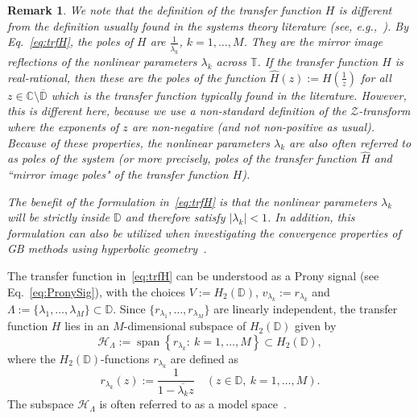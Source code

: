 \documentclass{arxiv}
\renewcommand{\hat}{\widehat}
\newtheorem{remarks}{Remark}[section]
\begin{document}
\begin{remarks}
\label{rem:mirrorpole}
We note that the definition of the transfer function $H$ is different from the definition usually found in the systems theory literature (see, e.g.,~\cite{vandenhof}). By Eq.~\eqref{eq:trfH}, the poles of $H$ are $\frac{1}{\overline{\lambda_k}}$, $k=1,\ldots, M$. They are the mirror image reflections of the nonlinear parameters $\lambda_k$ across $\mathbb{T}$. If the transfer function $H$ is real-rational, then these are the poles of the function $\hat{H}(z) := H(\frac{1}{z})$ for all $z \in \mathbb{C} \setminus \overline{\mathbb{D}}$ which is the transfer function typically found in the literature. However, this is different here, because we use a non-standard definition of the $\mathcal{Z}$-transform where the  exponents of $z$ are non-negative (and not non-positive as usual). Because of these properties, the nonlinear parameters $\lambda_k$ are also often referred to as poles of the system (or more precisely, poles of the transfer function $\hat{H}$ and ``mirror image poles" of the transfer function $H$).

The benefit of the formulation in~\eqref{eq:trfH} is that the nonlinear parameters $\lambda_k$ will be strictly inside $\mathbb{D}$ and therefore satisfy $|\lambda_k| < 1$. In addition, this formulation can also be utilized when investigating the convergence properties of GB methods using hyperbolic geometry~\cite{siamdozsa}.
\end{remarks}

The transfer function in~\eqref{eq:trfH} can be understood as a Prony signal (see Eq.~\eqref{eq:PronySig}), with the choices $V := H_2(\mathbb{D})$, $v_{\lambda_k} := r_{\lambda_k}$ and $\Lambda := \{\lambda_1, \ldots, \lambda_M\} \subset \mathbb{D}$. Since $\{r_{\lambda_1},\ldots,r_{\lambda_M}\}$ are linearly independent, the transfer function $H$ lies in an $M$-dimensional subspace of $H_2(\mathbb{D})$ given by
\begin{equation}
    \label{eq:modspace}
    \mathcal{H}_{\Lambda} := \operatorname{span} \left\{ r_{\lambda_k}: \ k=1,\ldots,M \right\}  \subset H_2(\mathbb{D}),
\end{equation}
where the $H_2(\mathbb{D})$-functions $r_{\lambda_k}$ are defined as
\begin{equation}\label{eq:def_rlambda}
r_{\lambda_k}(z) := \frac{1}{1-\overline{\lambda_k}z} \quad (z\in \mathbb{D}, \ k=1,\ldots,M).
\end{equation}
The subspace $\mathcal{H}_{\Lambda}$ is often referred to as a model space~\cite{bprodbook}. 
\end{document}
